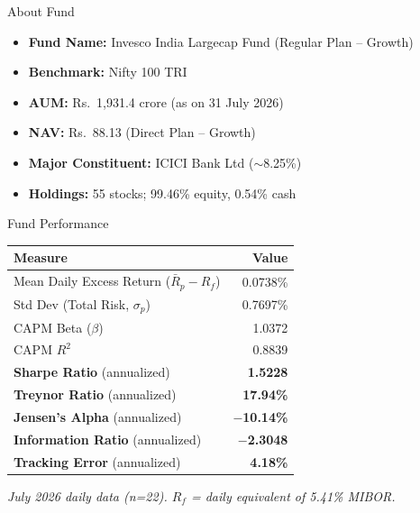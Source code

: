 \documentclass[11pt, aspectratio=43]{beamer}
\begin{document}
\begin{frame}{About Fund}
\begin{itemize}
    \item \textbf{Fund Name:} Invesco India Largecap Fund (Regular Plan -- Growth)
    \item \textbf{Benchmark:} Nifty 100 TRI
    \item \textbf{AUM:} Rs.\ 1,931.4 crore (as on 31 July 2026)
    \item \textbf{NAV:} Rs.\ 88.13 (Direct Plan -- Growth)
    \item \textbf{Major Constituent:} ICICI Bank Ltd ($\sim$8.25\%)
    \item \textbf{Holdings:} 55 stocks; 99.46\% equity, 0.54\% cash
\end{itemize}
\end{frame}


\begin{frame}{Fund Performance}
\centering
\small
\begin{tabular}{l r}
\toprule
\textbf{Measure} & \textbf{Value} \\
\midrule
Mean Daily Excess Return ($\bar{R}_p - R_f$) & 0.0738\% \\
Std Dev (Total Risk, $\sigma_p$) & 0.7697\% \\
CAPM Beta ($\beta$) & 1.0372 \\
CAPM $R^2$ & 0.8839 \\
\midrule
\textbf{Sharpe Ratio} (annualized) & \textbf{1.5228} \\
\textbf{Treynor Ratio} (annualized) & \textbf{17.94\%} \\
\textbf{Jensen's Alpha} (annualized) & \textbf{$-$10.14\%} \\
\textbf{Information Ratio} (annualized) & \textbf{$-$2.3048} \\
\textbf{Tracking Error} (annualized) & \textbf{4.18\%} \\
\bottomrule
\end{tabular}

\vspace{0.8em}
\footnotesize
\textit{July 2026 daily data (n=22). $R_f$ = daily equivalent of 5.41\% MIBOR.}
\end{frame}
\end{document}
